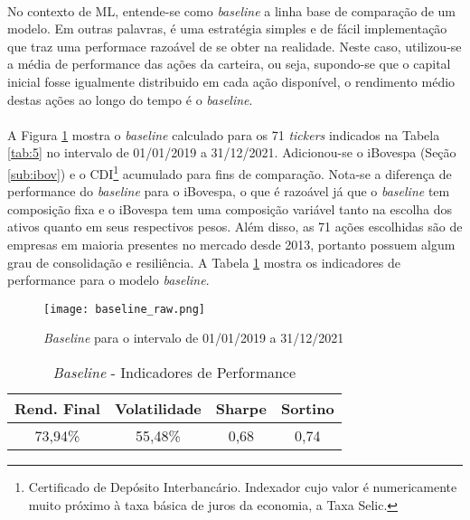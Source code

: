 \paragraph{} No contexto de ML, entende-se como \textit{baseline} a linha base de comparação de um modelo. Em outras palavras, é uma estratégia simples e de fácil implementação que traz uma performace razoável de se obter na realidade. Neste caso, utilizou-se a média de performance das ações da carteira, ou seja, supondo-se que o capital inicial fosse igualmente distribuido em cada ação disponível, o rendimento médio destas ações ao longo do tempo é o \textit{baseline}.

\paragraph{} A Figura \ref{fig:170} mostra o \textit{baseline} calculado para os 71 \textit{tickers} indicados na Tabela \ref{tab:5} no intervalo de 01/01/2019 a 31/12/2021. Adicionou-se o iBovespa (Seção \ref{sub:ibov}) e o CDI\footnote{Certificado de Depósito Interbancário. Indexador cujo valor é numericamente muito próximo à taxa básica de juros da economia, a Taxa Selic.} acumulado para fins de comparação. Nota-se a diferença de performance do \textit{baseline} para o iBovespa, o que é razoável já que o \textit{baseline} tem composição fixa e o iBovespa tem uma composição variável tanto na escolha dos ativos quanto em seus respectivos pesos. Além disso, as 71 ações escolhidas são de empresas em maioria presentes no mercado desde 2013, portanto possuem algum grau de consolidação e resiliência. A Tabela \ref{tab:12} mostra os indicadores de performance para o modelo \textit{baseline}.

\begin{figure}[!htb]
    \texttt{[image: baseline\_raw.png]}
    \centering
    \caption{\textit{Baseline} para o intervalo de 01/01/2019 a 31/12/2021}
    \label{fig:170}
\end{figure}

\begin{table}[!htb]
    \begin{center}
        \begin{tabular}{ cccc }
            Rend. Final & Volatilidade & Sharpe & Sortino \\
            \hline
            73,94\% & 55,48\% & 0,68 & 0,74 \\
        \end{tabular}
        \caption{\textit{Baseline} - Indicadores de Performance}
        \label{tab:12}
    \end{center}
\end{table}

